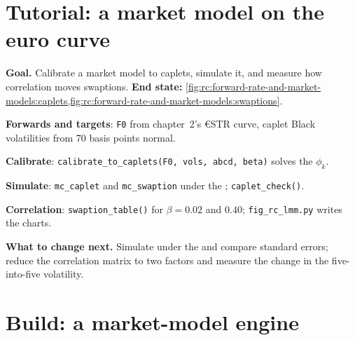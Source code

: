 \section{Tutorial: a market model on the euro curve}\label{tut:rc:forward-rate-and-market-models:tutorial}

\begin{tutorial}
\textbf{Goal.} Calibrate a market model to caplets, simulate it, and measure how
correlation moves swaptions. \textbf{End state:}
\cref{fig:rc:forward-rate-and-market-models:caplets,fig:rc:forward-rate-and-market-models:swaptions}.
\begin{tutsteps}
\item \textbf{Forwards and targets}: \texttt{F0} from chapter~2's €STR curve, caplet
Black volatilities from 70 basis points normal.
\item \textbf{Calibrate}: \texttt{calibrate\_to\_caplets(F0, vols, abcd, beta)}
solves the $\phi_k$.
\item \textbf{Simulate}: \texttt{mc\_caplet} and \texttt{mc\_swaption} under the ; \texttt{caplet\_check()}.
\item \textbf{Correlation}: \texttt{swaption\_table()} for $\beta=0.02$ and $0.40$;
\texttt{fig\_rc\_lmm.py} writes the charts.
\end{tutsteps}
\textbf{What to change next.} Simulate under the  and compare
standard errors; reduce the correlation matrix to two factors and measure the
change in the five-into-five volatility.
\end{tutorial}

\section{Build: a market-model engine}\label{bld:rc:forward-rate-and-market-models:lmm}

